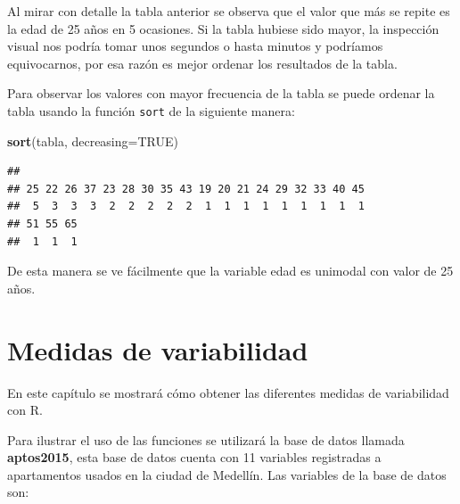 \documentclass[10pt,]{krantz}
\makeatletter
\newenvironment{Shaded}{\begin{snugshade}}{\end{snugshade}}
\newcommand{\KeywordTok}[1]{\textcolor[rgb]{0.13,0.29,0.53}{\textbf{{#1}}}}
\newcommand{\DataTypeTok}[1]{\textcolor[rgb]{0.13,0.29,0.53}{{#1}}}
\newcommand{\OtherTok}[1]{\textcolor[rgb]{0.56,0.35,0.01}{{#1}}}
\newcommand{\NormalTok}[1]{{#1}}
\let\proglang=\textsf
\newenvironment{kframe}{%
\medskip{}
\setlength{\fboxsep}{.8em}
 \def\at@end@of@kframe{}%
 \ifinner\ifhmode%
  \def\at@end@of@kframe{\end{minipage}}%
  \begin{minipage}{\columnwidth}%
 \fi\fi%
 \def\FrameCommand##1{\hskip\@totalleftmargin \hskip-\fboxsep
 \colorbox{shadecolor}{##1}\hskip-\fboxsep
     \hskip-\linewidth \hskip-\@totalleftmargin \hskip\columnwidth}%
 \MakeFramed {\advance\hsize-\width
   \@totalleftmargin\z@ \linewidth\hsize
   \@setminipage}}%
 {\par\unskip\endMakeFramed%
 \at@end@of@kframe}
\renewenvironment{Shaded}{\begin{kframe}}{\end{kframe}}
\makeatother
\begin{document}
Al mirar con detalle la tabla anterior se observa que el valor que más
se repite es la edad de 25 años en 5 ocasiones. Si la tabla hubiese sido
mayor, la inspección visual nos podría tomar unos segundos o hasta
minutos y podríamos equivocarnos, por esa razón es mejor ordenar los
resultados de la tabla.

Para observar los valores con mayor frecuencia de la tabla se puede
ordenar la tabla usando la función \texttt{sort} de la siguiente manera:

\begin{Shaded}
\begin{Highlighting}[]
\KeywordTok{sort}\NormalTok{(tabla, }\DataTypeTok{decreasing=}\OtherTok{TRUE}\NormalTok{)}
\end{Highlighting}
\end{Shaded}

\begin{verbatim}
## 
## 25 22 26 37 23 28 30 35 43 19 20 21 24 29 32 33 40 45 
##  5  3  3  3  2  2  2  2  2  1  1  1  1  1  1  1  1  1 
## 51 55 65 
##  1  1  1
\end{verbatim}

De esta manera se ve fácilmente que la variable edad es unimodal con
valor de 25 años.

\chapter{\texorpdfstring{Medidas de variabilidad
\label{varia}}{Medidas de variabilidad }}\label{medidas-de-variabilidad}

En este capítulo se mostrará cómo obtener las diferentes medidas de
variabilidad con \proglang{R}.

Para ilustrar el uso de las funciones se utilizará la base de datos
llamada \textbf{aptos2015}, esta base de datos cuenta con 11 variables
registradas a apartamentos usados en la ciudad de Medellín. Las
variables de la base de datos son:
\end{document}

